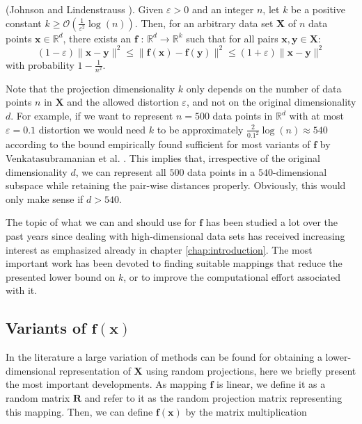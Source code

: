 \vspace{0.2cm}
\begin{lemma}\label{lemma:onelemma}
	(Johnson and Lindenstrauss \cite{johnson1984extensions}). Given $\varepsilon > 0$ and an integer $n$, let $k$ be a positive constant $k \geq \mathcal{O}(\frac{1}{\varepsilon^2}\log(n))$. Then, for an arbitrary data set ${\mathbf X}$ of $n$ data points ${\mathbf x} \in \mathbb{R}^d$, there exists an $\mathbf{f}$ : ${\mathbb R}^d \rightarrow {\mathbb R}^k$ such that for all pairs ${\mathbf x}, {\mathbf y} \in {\mathbf X}$:
	\[(1-\varepsilon)\|{\mathbf x} - {\mathbf y}\|^2 \leq \|\mathbf{f}({\mathbf x}) - \mathbf{f}({\mathbf y})\|^2 \leq (1+\varepsilon)\|{\mathbf x} - {\mathbf y}\|^2 \]
	with probability $1-\frac{1}{n^2}$.
\end{lemma}
\vspace{0.2cm}

Note that the projection dimensionality $k$ only depends on the number of data points $n$ in $\mathbf{X}$ and the allowed distortion $\varepsilon$, and not on the original dimensionality $d$. For example, if we want to represent $n=500$ data points in $\mathbb{R}^d$ with at most $\varepsilon = 0.1$ distortion we would need $k$ to be approximately $\frac{2}{0.1^2}\log(n) \approx 540$ according to the bound empirically found sufficient for most variants of $\mathbf{f}$ by Venkatasubramanian et al. \cite{venkatasubramanian2011johnson}. This implies that, irrespective of the original dimensionality $d$, we can represent all $500$ data points in a $540$-dimensional subspace while retaining the pair-wise distances properly. Obviously, this would only make sense if $d > 540$. 

The topic of what we can and should use for $\mathbf{f}$ has been studied a lot over the past years since dealing with high-dimensional data sets has received increasing interest as emphasized already in chapter \ref{chap:introduction}.
The most important work has been devoted to finding suitable mappings that reduce the presented lower bound on $k$, or to improve the computational effort associated with it. 

\vspace{0.3cm}
\subsection{Variants of $\mathbf{f}(\mathbf{x})$}

In the literature a large variation of methods can be found for obtaining a lower-dimensional representation of $\mathbf{X}$ using random projections, here we briefly present the most important developments. As mapping $\mathbf{f}$ is linear, we define it as a random matrix $\mathbf{R}$ and refer to it as the random projection matrix representing this mapping. Then, we can define $\mathbf{f}(\mathbf{x})$ by the matrix multiplication

